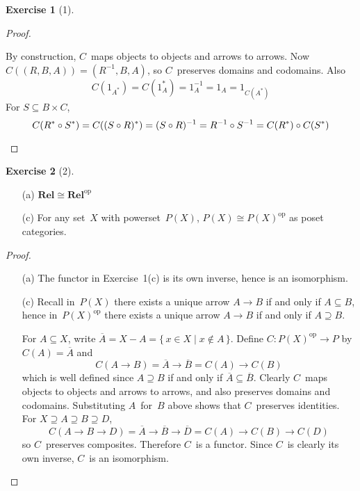 \documentclass[letterpaper,12pt]{article}
\newcommand{\iso}{\cong}
\newcommand{\after}{\circ}
\newcommand{\comp}[1]{\overline{#1}}
\newcommand{\inv}[1]{#1^{-1}}
\renewcommand{\star}[1]{#1^{*}}
\newcommand{\cat}[1]{\mathbf{#1}}
\newcommand{\dual}[1]{#1^{\mathrm{op}}}
\newcommand{\Rel}{\cat{Rel}}
\newcommand{\Relop}{\dual{\Rel}}
\theoremstyle{definition}
\newtheorem*{exer}{Exercise}
\theoremstyle{remark}
\theoremstyle{direction}
\begin{document}
\begin{exer}[1]
\begin{proof}
\begin{enumerate}[itemsep=0pt]
By construction, \(C\)~maps objects to objects and arrows to arrows. Now \(C((R,B,A))=(\inv{R},B,A)\), so \(C\)~preserves domains and codomains. Also
\[C(1_{\star{A}})=C(\star{1_A})=\inv{1_A}=1_A=1_{C(\star{A})}\]
For \(S\subseteq B\times C\),
\[C(\star{R}\after\star{S})=C(\star{(S\after R)})=\inv{(S\after R)}=\inv{R}\after\inv{S}=C(\star{R})\after C(\star{S})\qedhere\]
\end{enumerate}
\end{proof}
\end{exer}

\begin{exer}[2]\
\begin{enumerate}[itemsep=0pt]
\item[(a)] \(\Rel\iso\Relop\)
\item[(c)] For any set~\(X\) with powerset~\(P(X)\), \(P(X)\iso\dual{P(X)}\) as poset categories.
\end{enumerate}
\begin{proof}\
\begin{enumerate}[itemsep=0pt]
\item[(a)] The functor in Exercise~1(c) is its own inverse, hence is an isomorphism.
\item[(c)] Recall in~\(P(X)\) there exists a unique arrow \(A\to B\) if and only if \(A\subseteq B\), hence in~\(\dual{P(X)}\) there exists a unique arrow \(A\to B\) if and only if \(A\supseteq B\).

For \(A\subseteq X\), write \(\comp{A}=X-A=\{\,x\in X\mid x\not\in A\,\}\). Define \(C:\dual{P(X)}\to P\) by \(C(A)=\comp{A}\) and
\[C(A\to B)=\comp{A}\to\comp{B}=C(A)\to C(B)\]
which is well defined since \(A\supseteq B\) if and only if \(\comp{A}\subseteq\comp{B}\). Clearly \(C\)~maps objects to objects and arrows to arrows, and also preserves domains and codomains. Substituting \(A\)~for~\(B\) above shows that \(C\)~preserves identities. For \(X\supseteq A\supseteq B\supseteq D\),
\[C(A\to B\to D)=\comp{A}\to\comp{B}\to\comp{D}=C(A)\to C(B)\to C(D)\]
so \(C\)~preserves composites. Therefore \(C\)~is a functor. Since \(C\)~is clearly its own inverse, \(C\)~is an isomorphism.\qedhere
\end{enumerate}
\end{proof}
\end{exer}
\end{document}
